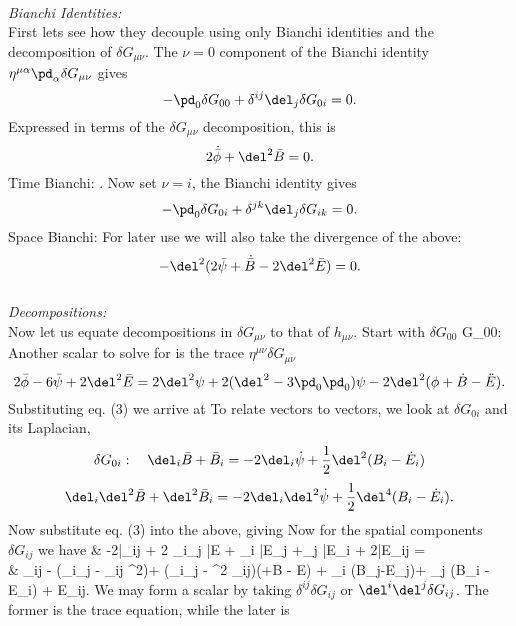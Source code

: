 \documentclass[10pt,letterpaper]{article}
\begin{document}
\\ 
\textit{Bianchi Identities:}
\\
First lets see how they decouple using only Bianchi identities and the decomposition of $\delta G_{\mu\nu}$. The $\nu = 0$ component of the Bianchi identity $\eta^{\mu\alpha}\pd_\alpha \delta G_{\mu\nu}$ gives
\[
	-\pd_0 \delta G_{00} +\delta^{ij}\del_j \delta G_{0i} = 0.
\]
Expressed in terms of the $\delta G_{\mu\nu}$ decomposition, this is
\[
	2\dot{\bar\phi} + \del^2\bar B = 0.
\]
Time Bianchi:
\be
	.
\ee
Now set $\nu = i$, the Bianchi identity gives
\[
	-\pd_0 \delta G_{0i} + \delta^{jk} \del_j \delta G_{ik} =0.
\]
Space Bianchi:
\be
\ee
For later use we will also take the divergence of the above:
\[
	-\del^2 (2\bar\psi +\dot{\bar B} - 2\del^2 \bar E)=0.
\]
\\ 
\textit{Decompositions:}\\
Now let us equate decompositions in $\delta G_{\mu\nu}$ to that of $h_{\mu\nu}$. Start with $\delta G_{00}$
\be
	\delta G_{00}:\quad \boxed{\bar \phi = \del^2 \psi} \quad{}\quad {}
\ee
Another scalar to solve for is the trace $\eta^{\mu\nu} \delta G_{\mu\nu}$
\[
	2\bar\phi - 6\bar \psi + 2\del^2 \bar E = 2\del^2 \psi +2(\del^2-3\pd_0\pd_0)\psi - 2\del^2 (\phi +\dot B - \ddot E) .
\]
Substituting eq. (3) we arrive at
\be
\ee
To relate vectors to vectors, we look at $\delta G_{0i}$ and its Laplacian,
\[
	\delta G_{0i}:\quad \del_i \bar B +\bar B_i = -2\del_i \dot \psi + \frac12 \del^2(B_i-\dot E_i)
\]
\[
	\del_i \del^2 \bar B + \del^2 \bar B_i = -2 \del_i \del^2 \dot \psi + \frac12 \del^4 (B_i - \dot E_i).
\]
Now substitute eq. (3)  into the above, giving
\be
\ee
Now for the spatial components $\delta G_{ij}$ we have
\ba
	& -2\bar \psi \delta_{ij} + 2 \del_i\del_j \bar E + \del_i \bar E_j +\del_j \bar E_i + 2\bar E_{ij} =\\
	& \ddot \psi \delta_{ij} - (\del_i\del_j - \delta_{ij} \del^2)\psi + (\del_i\del_j - \del^2 \delta_{ij})(\phi+\dot B - \ddot E) +  \del_i (\dot B_j-\ddot E_j)+ \del_j (\dot B_i - \ddot E_i) + \Box E_{ij}.
\ea
We may form a scalar by taking $\delta^{ij}\delta G_{ij}$ or $\del^i\del^j \delta G_{ij}$. The former is the trace equation, while the later is
\end{document}
